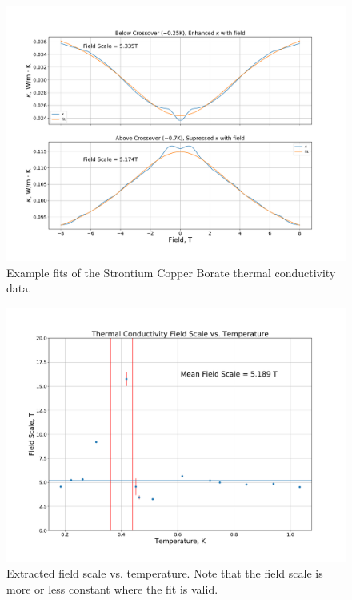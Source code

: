 \documentclass{thesis-umich}
\begin{document}
\begin{figure}
	\caption[Example fits of SCBO data.]{Example fits of the Strontium Copper Borate thermal conductivity data.}
	\includegraphics[width=\columnwidth]{figures/SCBO_kappa_vs_b_fits.pdf}
\end{figure}

\begin{figure}
	\caption[Extracted Field Scale vs. Temperature]{Extracted field scale vs. temperature. Note that the field scale is more or less constant where the fit is valid.}
	\includegraphics[width=\columnwidth]{figures/SCBO_field_scale.pdf}
\end{figure}



\end{document}

